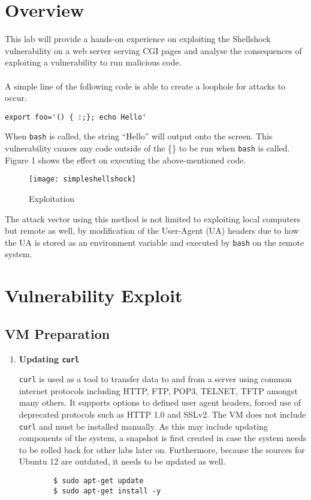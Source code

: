 \documentclass[a4paper,12pt]{article}
\begin{document}
\section{Overview}
This lab will provide a hands-on experience on exploiting the Shellshock vulnerability on a web server serving CGI pages and analyse the consequences of exploiting a vulnerability to run malicious code.\\\\A simple line of the following code is able to create a loophole for attacks to occur.\begin{verbatim}
export foo='() { :;}; echo Hello'
\end{verbatim}
When \texttt{bash} is called, the string ``Hello'' will output onto the screen. This vulnerability causes any code outside of the \{\} to be run when \texttt{bash} is called. Figure 1 shows the effect on executing the above-mentioned code.
\begin{figure}[H]
	\centering
	\texttt{[image: simpleshellshock]}
	\caption{Exploitation}
	\label{fig:simpleshellshock}
\end{figure}
\noindent The attack vector using this method is not limited to exploiting local computers but remote as well, by modification of the User-Agent (UA) headers due to how the UA is stored as an environment variable and executed by \texttt{bash} on the remote system.
\newpage
\section{Vulnerability Exploit}
\subsection{VM Preparation}
\vspace{1em}
\begin{enumerate}
	\item \textbf{Updating \texttt{curl}}
	\begin{par}\texttt{curl} is used as a tool to transfer data to and from a server using common internet protocols including HTTP, FTP, POP3, TELNET, TFTP amongst many others. It supports options to defined user agent headers, forced use of deprecated protocols such as HTTP 1.0 and SSLv2. The VM does not include \texttt{curl} and must be installed manually. As this may include updating components of the system, a snapshot is first created in case the system needs to be rolled back for other labs later on. Furthermore, because the sources for Ubuntu 12 are outdated, it needs to be updated as well.
		\begin{verbatim}
		$ sudo apt-get update
		$ sudo apt-get install -y
		\end{verbatim}
	\end{par}
\end{enumerate}
\end{document}
